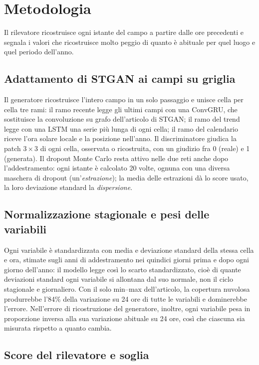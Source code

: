 \documentclass[11pt,a4paper]{article}
\begin{document}
\section{Metodologia}

Il rilevatore ricostruisce ogni istante del campo a partire dalle ore precedenti e segnala i valori che ricostruisce molto peggio di quanto è abituale per quel luogo e quel periodo dell'anno.

\subsection{Adattamento di STGAN ai campi su griglia}

Il generatore ricostruisce l'intero campo in un solo passaggio e unisce cella per cella tre rami: il ramo recente legge gli ultimi campi con una ConvGRU, che sostituisce la convoluzione su grafo dell'articolo di STGAN; il ramo del trend legge con una LSTM una serie più lunga di ogni cella; il ramo del calendario riceve l'ora solare locale e la posizione nell'anno. Il discriminatore giudica la patch $3\times3$ di ogni cella, osservata o ricostruita, con un giudizio fra 0 (reale) e 1 (generata). Il dropout Monte Carlo resta attivo nelle due reti anche dopo l'addestramento: ogni istante è calcolato 20 volte, ognuna con una diversa maschera di dropout (un'\emph{estrazione}); la media delle estrazioni dà lo score usato, la loro deviazione standard la \emph{dispersione}.

\subsection{Normalizzazione stagionale e pesi delle variabili}

Ogni variabile è standardizzata con media e deviazione standard della stessa cella e ora, stimate sugli anni di addestramento nei quindici giorni prima e dopo ogni giorno dell'anno: il modello legge così lo scarto standardizzato, cioè di quante deviazioni standard ogni variabile si allontana dal suo normale, non il ciclo stagionale e giornaliero. Con il solo min--max dell'articolo, la copertura nuvolosa produrrebbe l'84\% della variazione su 24 ore di tutte le variabili e dominerebbe l'errore. Nell'errore di ricostruzione del generatore, inoltre, ogni variabile pesa in proporzione inversa alla sua variazione abituale su 24 ore, così che ciascuna sia misurata rispetto a quanto cambia.

\subsection{Score del rilevatore e soglia}
\end{document}
